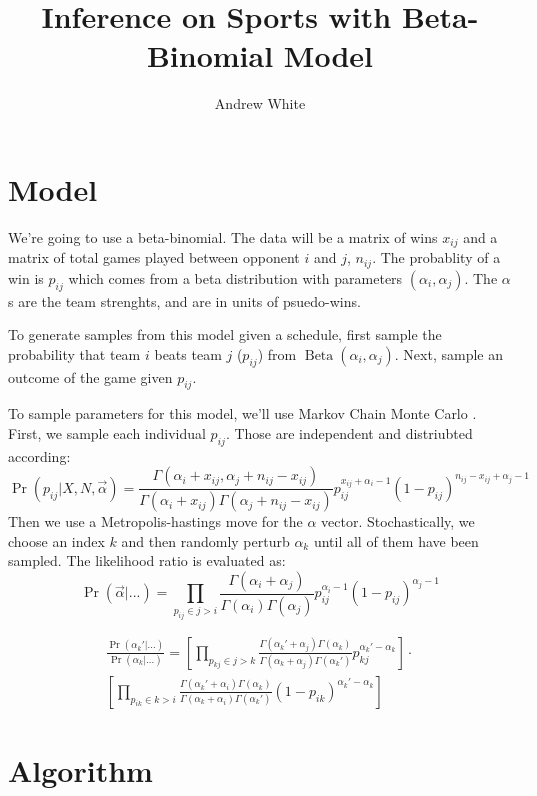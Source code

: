 \documentclass{article}
\author{Andrew White}
\title{Inference on Sports with Beta-Binomial Model}
\DeclareMathOperator{\Beta}{Beta}
\begin{document}
\maketitle

\section{Model}

We're going to use a beta-binomial. The data will be a matrix of
wins $x_{ij}$ and a matrix of total games played between opponent
$i$ and $j$, $n_{ij}$. The probablity of a win is $p_{ij}$ which comes
from a beta distribution with parameters $(\alpha_i, \alpha_j)$. The
$\alpha$s are the team strenghts, and are in units of psuedo-wins.

To generate samples from this model given a schedule, first sample the
probability that team $i$ beats team $j$ ($p_{ij}$) from
$\Beta(\alpha_i, \alpha_j)$. Next, sample an outcome of the game given
$p_{ij}$.

To sample parameters for this model, we'll use Markov Chain Monte
Carlo . First, we sample each individual $p_{ij}$. Those are
independent and distriubted according:
\[
\Pr(p_{ij} | X, N, \vec{\alpha}) = \frac{\Gamma (\alpha_i + x_{ij},
  \alpha_j + n_{ij} - x_{ij})}{\Gamma(\alpha_i +
  x_{ij})\Gamma(\alpha_j + n_{ij} - x_{ij})} p_{ij}^{x_{ij} + \alpha_i
  - 1}(1 - p_{ij})^{n_{ij} - x_{ij} + \alpha_j - 1}
\]
Then we use a Metropolis-hastings move for the $\alpha$
vector. Stochastically, we choose an index $k$ and then randomly
perturb $\alpha_k$ until all of them have been sampled. The likelihood
ratio is evaluated as:
\[
\Pr(\vec{\alpha}|...) = \prod_{p_{ij} \in j > i} \frac{\Gamma (\alpha_i +  \alpha_j)}{\Gamma(\alpha_i)\Gamma(\alpha_j)} p_{ij}^{\alpha_i - 1}(1 - p_{ij})^{\alpha_j - 1}
\]

\begin{multline}
\frac{\Pr(\alpha_k'|...)}{\Pr(\alpha_k|...)} = \left[\prod_{p_{kj} \in
    j > k} \frac{\Gamma (\alpha_k' + \alpha_j)\Gamma(\alpha_k)}{\Gamma(\alpha_k + \alpha_j)\Gamma(\alpha_k')}
  p_{kj}^{\alpha_k' - \alpha_k}\right] \cdot
\\
\left[\prod_{p_{ik} \in k > i}
  \frac{\Gamma (\alpha_k' +  \alpha_i)\Gamma(\alpha_k)}{\Gamma(\alpha_k + \alpha_i)\Gamma(\alpha_k')} (1 -
  p_{ik})^{\alpha_k' - \alpha_k}\right]
\end{multline}

\section{Algorithm}
\end{document}
